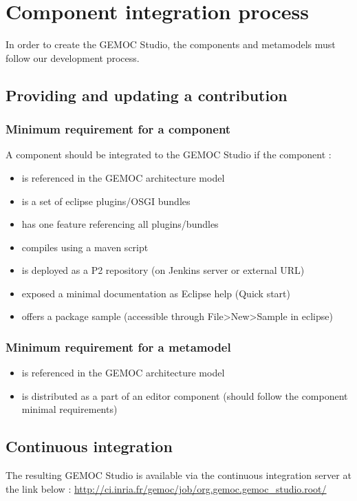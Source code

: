 \documentclass{gemoc} %
\begin{document}
\chapter{Component integration process}
In  order to create the GEMOC Studio, the components and metamodels must follow our development process.

\section{Providing and updating a contribution}
\subsection{Minimum requirement for a component}
A component should be integrated to the GEMOC Studio if the component :
\begin{itemize}
	\item is referenced in the GEMOC architecture model
	\item is a set of eclipse plugins/OSGI bundles
	\item has one feature referencing all plugins/bundles
	\item compiles using a maven script
	\item is deployed as a P2 repository (on Jenkins server or external URL)
	\item exposed a minimal documentation as Eclipse help (Quick start)
	\item offers a package sample (accessible through File>New>Sample in eclipse)
\end{itemize}
\subsection{Minimum requirement for a metamodel}
\begin{itemize}
	\item is referenced in the GEMOC architecture model
	\item is distributed as a part of an editor component (should follow the component minimal requirements)
\end{itemize}
\section{Continuous integration}
The resulting GEMOC Studio is available via the continuous integration server at the link below :
\newline
\url {http://ci.inria.fr/gemoc/job/org.gemoc.gemoc_studio.root/}
\end{document}
